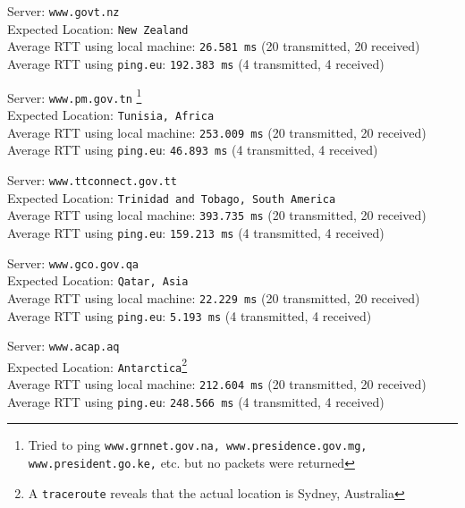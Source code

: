 \documentclass[11pt, fleqn]{article}
\begin{document}
\hrulefill
\smallskip

Server: \texttt{www.govt.nz} \\
Expected Location: \texttt{New Zealand}\\
Average RTT using local machine: \texttt{26.581 ms} (20 transmitted, 20 received)\\
Average RTT using \texttt{ping.eu}: \texttt{192.383 ms} (4 transmitted, 4 received)


\hrulefill
\smallskip

Server: \texttt{www.pm.gov.tn} \footnote{Tried to ping \texttt{www.grnnet.gov.na, www.presidence.gov.mg, www.president.go.ke,} etc. but no packets were returned}\\
Expected Location: \texttt{Tunisia, Africa}\\
Average RTT using local machine: \texttt{253.009 ms} (20 transmitted, 20 received)\\
Average RTT using \texttt{ping.eu}: \texttt{46.893 ms} (4 transmitted, 4 received)


\hrulefill
\smallskip


Server: \texttt{www.ttconnect.gov.tt} \\
Expected Location: \texttt{Trinidad and Tobago, South America}\\
Average RTT using local machine: \texttt{393.735 ms} (20 transmitted, 20 received)\\
Average RTT using \texttt{ping.eu}: \texttt{159.213 ms} (4 transmitted, 4 received)


\hrulefill
\smallskip


Server: \texttt{www.gco.gov.qa} \\
Expected Location: \texttt{Qatar, Asia}\\
Average RTT using local machine: \texttt{22.229 ms} (20 transmitted, 20 received)\\
Average RTT using \texttt{ping.eu}: \texttt{5.193 ms} (4 transmitted, 4 received)




\hrulefill
\smallskip


Server: \texttt{www.acap.aq} \\
Expected Location: \texttt{Antarctica}\footnote{A \texttt{traceroute} reveals that the actual location is Sydney, 
Australia}\\
Average RTT using local machine: \texttt{212.604 ms} (20 transmitted, 20 received)\\
Average RTT using \texttt{ping.eu}: \texttt{248.566 ms} (4 transmitted, 4 received)
\end{document}
